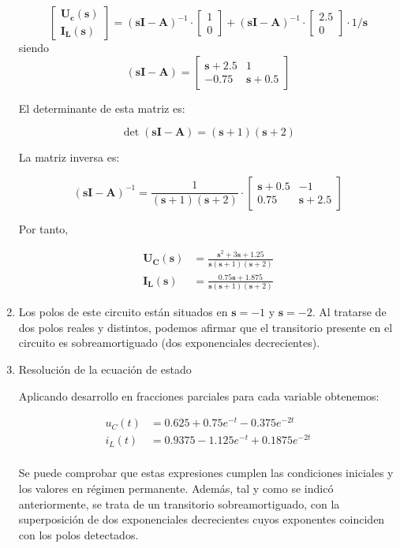 \documentclass[12pt]{article}
\newcommand{\laplace}[1]{\mathbf{#1}(\mathbf{s})}
\newcommand{\slp}{\mathbf{s}}
\begin{document}
\begin{enumerate}
    \[
    \left[
      \begin{array}{c}
        \laplace{U_c}\\
        \laplace{I_L}
      \end{array}
    \right] =
    \left(\slp \mathbf{I} - \mathbf{A} \right)^{-1} \cdot
    \left[
      \begin{array}{c}
        1\\
        0
      \end{array}
    \right] +
    \left(\slp \mathbf{I} - \mathbf{A} \right)^{-1} \cdot
    \left[
      \begin{array}{c}
        2.5\\
        0
      \end{array}
    \right] \cdot 1/\slp
  \]
siendo
\[
  \left(\slp \mathbf{I} - \mathbf{A} \right) = 
  \left[
    \begin{array}{cc}
    \slp + 2.5 &  1\\
    -0.75 & \slp +0.5
  \end{array}
\right]
\]


El determinante de esta matriz es:

\[
  \det{\left(\slp \mathbf{I} - \mathbf{A} \right)} = (\slp + 1)(\slp + 2)
\]

La matriz inversa es:

\[
  \left(\slp \mathbf{I} - \mathbf{A} \right)^{-1} = 
  \frac{1}{(\slp + 1)(\slp +2)} \cdot \left[
     \begin{array}{cc}
       \slp + 0.5 &  -1\\
       0.75 & \slp + 2.5
     \end{array}
   \right]
\]

Por tanto,

\begin{align*}
  \laplace{U_C} &= \frac{\slp^2 + 3\slp + 1.25}{\slp(\slp + 1)(\slp +2)}\\
  \laplace{I_L} &= \frac{0.75\slp + 1.875}{\slp(\slp + 1)(\slp +2)}
\end{align*}

\item Los polos de este circuito están situados en $\slp = -1$ y $\slp = -2$. Al tratarse de dos polos reales y distintos, podemos afirmar que el transitorio presente en el circuito es sobreamortiguado (dos exponenciales decrecientes).


\item Resolución de la ecuación de estado

Aplicando desarrollo en fracciones parciales para cada variable obtenemos:

\begin{align*}
  u_C(t) &= 0.625 + 0.75 e^{-t} - 0.375 e^{-2t}\\
  i_L(t) &=  0.9375 - 1.125 e^{-t} + 0.1875 e^{-2t}\\
\end{align*}

Se puede comprobar que estas expresiones cumplen las condiciones iniciales y los valores en régimen permanente. Además, tal y como se indicó anteriormente, se trata de un transitorio sobreamortiguado, con la superposición de dos exponenciales decrecientes cuyos exponentes coinciden con los polos detectados.
\end{enumerate}
\end{document}
